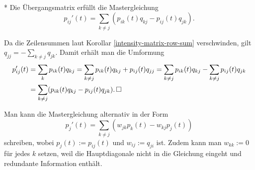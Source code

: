 \begin{Korollar}[Mastergleichung]\mbox{}\\*
Die Übergangsmatrix erfüllt die Mastergleichung
\[p_{ij}'(t) = \sum_{k\ne j} (p_{ik}(t)q_{kj} - p_{ij}(t)q_{jk}).\]
\end{Korollar}
\begin{Beweis}
Da die Zeilensummen laut Korollar \ref{intensity-matrix-row-sum}
verschwinden, gilt $q_{jj} = -\sum_{k\ne j} q_{jk}$.
Damit erhält man die Umformung
\begin{align*}
p_{ij}'(t) &= \sum_k p_{ik}(t)q_{kj}
= \sum_{k\ne j} p_{ik}(t)q_{kj} + p_{ij}(t)q_{jj}
= \sum_{k\ne j} p_{ik}(t)q_{kj} - \sum_{k\ne j} p_{ij}(t)q_{jk}\\
&= \sum_{k\ne j} (p_{ik}(t)q_{kj} - p_{ij}(t)q_{jk}).\,\square
\end{align*}
\end{Beweis}
 Man kann die Mastergleichung alternativ in der Form
\[p_j'(t) = \sum_{k\ne j} (w_{jk}p_k(t) - w_{kj}p_j(t))\]
schreiben, wobei $p_j(t):=p_{ij}(t)$ und $w_{ij}:=q_{ji}$ ist.
Zudem kann man $w_{kk}:=0$ für jedes $k$ setzen, weil die Hauptdiagonale
nicht in die Gleichung eingeht und redundante Information enthält.

